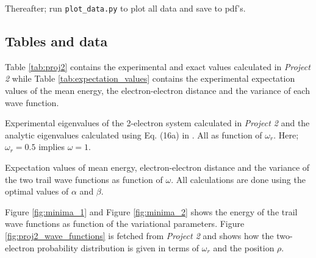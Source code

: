 \documentclass[12pt,english,a4paper]{article}
\begin{document}
Thereafter; run \texttt{plot\_data.py} to plot all data and save to pdf's.

\subsection{Tables and data} \label{section:appendix:tables}

Table \ref{tab:proj2} contains the experimental and exact values calculated in \textit{Project 2} while Table \ref{tab:expectation_values} contains the experimental expectation values of the mean energy, the electron-electron distance and the variance of each wave function. 

\begin{table}[htb]
    \centering
        \caption{Experimental eigenvalues of the 2-electron system calculated in \textit{Project 2} and the analytic eigenvalues calculated using Eq. (16a) in \cite{Taut}. All as function of $\omega_r$. Here; $\omega_r=0.5$ implies $\omega=1$.}
        \label{tab:proj2}
\end{table}

\begin{table}[htb]
    \centering
        \caption{Expectation values of mean energy, electron-electron distance and the variance of the two trail wave functions as function of $\omega$. All calculations are done using the optimal values of $\alpha$ and $\beta$.}
        \label{tab:expectation_values}
\end{table}

Figure \ref{fig:minima_1} and Figure \ref{fig:minima_2} shows the energy of the trail wave functions as function of the variational parameters. Figure \ref{fig:proj2_wave_functions} is fetched from \textit{Project 2} and shows how the two-electron probability distribution is given in terms of $\omega_r$ and the position $\rho$.
\end{document}
